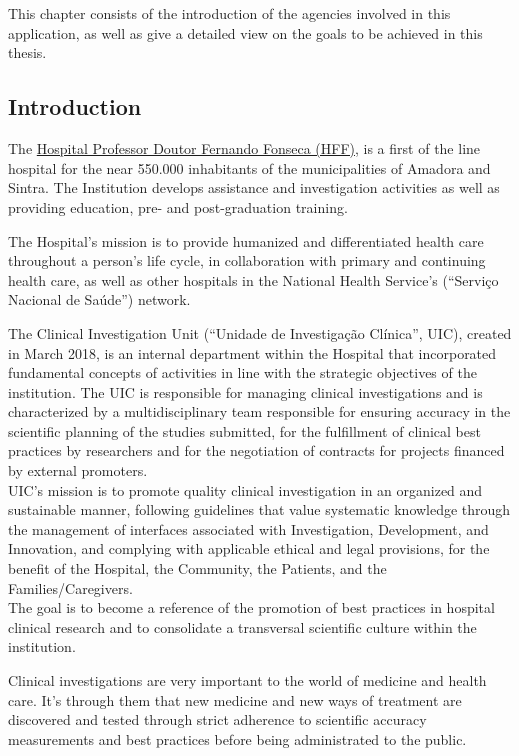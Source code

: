 \chapter{}\label{ch:intro}
This chapter consists of the introduction of the agencies involved in
this application, as well as give a detailed view on the goals to be
achieved in this thesis.

\section{Introduction}\label{ch:intro:sec:intro}
The \href{https://hff.min-saude.pt/}{Hospital Professor Doutor Fernando Fonseca (HFF)}, is a first of the line hospital for the near 550.000 inhabitants of the municipalities of Amadora and Sintra. The Institution develops assistance and investigation activities as well as providing education, pre- and post-graduation training.

The Hospital's mission is to provide humanized and differentiated health
care throughout a person's life cycle, in collaboration with primary and
continuing health care, as well as other hospitals in the National
Health Service's (``Serviço Nacional de Saúde'') network.

The Clinical Investigation Unit (``Unidade de Investigação Clínica'',
UIC), created in March 2018, is an internal department within the
Hospital that incorporated fundamental concepts of activities in line
with the strategic objectives of the institution. The UIC is responsible
for managing clinical investigations and is characterized by a
multidisciplinary team responsible for ensuring accuracy in the
scientific planning of the studies submitted, for the fulfillment of
clinical best practices by researchers and for the negotiation of
contracts for projects financed by external promoters.\\
UIC's mission is to promote quality clinical investigation in an
organized and sustainable manner, following guidelines that value
systematic knowledge through the management of interfaces associated
with Investigation, Development, and Innovation, and complying with
applicable ethical and legal provisions, for the benefit of the
Hospital, the Community, the Patients, and the Families/Caregivers.\\
The goal is to become a reference of the promotion of best practices in
hospital clinical research and to consolidate a transversal scientific
culture within the institution.

Clinical investigations are very important to the world of medicine and
health care. It's through them that new medicine and new ways of
treatment are discovered and tested through strict adherence to 
scientific accuracy measurements and best practices before being
administrated to the public. \\

